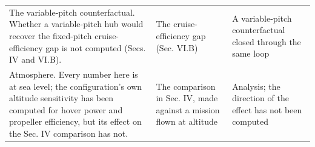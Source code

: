 \documentclass[journal]{new-aiaa}
\begin{document}
\begin{table}[htbp]
\begin{tabularx}{\linewidth}{XXX}
The variable-pitch counterfactual. Whether a variable-pitch hub would recover the fixed-pitch cruise-efficiency gap is not computed (Secs. IV and VI.B). & The cruise-efficiency gap (Sec. VI.B) & A variable-pitch counterfactual closed through the same loop \\
Atmosphere. Every number here is at sea level; the configuration's own altitude sensitivity has been computed for hover power and propeller efficiency, but its effect on the Sec. IV comparison has not. & The comparison in Sec. IV, made against a mission flown at altitude & Analysis; the direction of the effect has not been computed \\
\hline
\end{tabularx}
\end{table}
\end{document}
